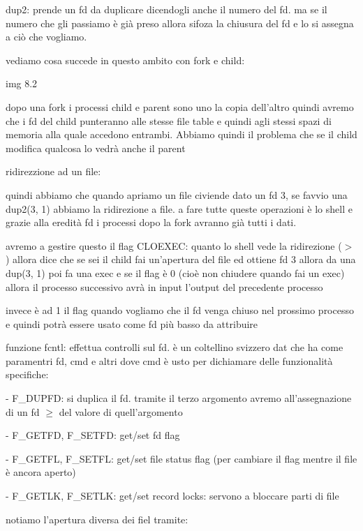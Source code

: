 dup2: prende un fd da duplicare dicendogli anche il numero del fd. ma se il numero che gli passiamo è già preso allora sifoza la chiusura del fd e lo si assegna a ciò che vogliamo.



vediamo cosa succede in questo ambito con fork e child:


img 8.2 


dopo una fork i processi child e parent sono uno la copia dell'altro quindi avremo che i fd del child punteranno alle stesse file table e quindi agli stessi spazi di memoria alla quale accedono entrambi. Abbiamo quindi il problema che se il child modifica qualcosa lo vedrà anche il parent





ridirezzione ad un file:

quindi abbiamo che quando apriamo un file civiende dato un fd 3, se favvio una dup2(3, 1) abbiamo la ridirezione a file. a fare tutte queste operazioni è lo shell e grazie alla eredità fd i processi dopo la fork avranno già tutti i dati.

avremo a gestire questo il flag CLOEXEC: quanto lo shell vede la ridirezione ($>$) allora dice che se sei il child fai un'apertura del file ed ottiene fd 3 allora da una dup(3, 1) poi fa una exec e se il flag è 0 (cioè non chiudere quando fai un exec) allora il processo successivo avrà in input l'output del precedente  processo

invece è ad 1 il flag quando vogliamo che il fd venga chiuso nel prossimo processo e quindi potrà essere usato come fd più basso da attribuire


funzione fcntl:
 effettua controlli sul fd. è un coltellino svizzero dat che ha come paramentri fd, cmd e altri dove cmd è usto per dichiamare delle funzionalità specifiche:

- F\_DUPFD: si duplica il fd. tramite il terzo argomento avremo all'assegnazione di un fd $\geq$ del valore di quell'argomento

- F\_GETFD, F\_SETFD: get/set fd flag

- F\_GETFL, F\_SETFL: get/set file status flag (per cambiare il flag mentre il file è ancora aperto)

- F\_GETLK, F\_SETLK: get/set record locks: servono a bloccare parti di file


notiamo l'apertura diversa dei fiel tramite:

